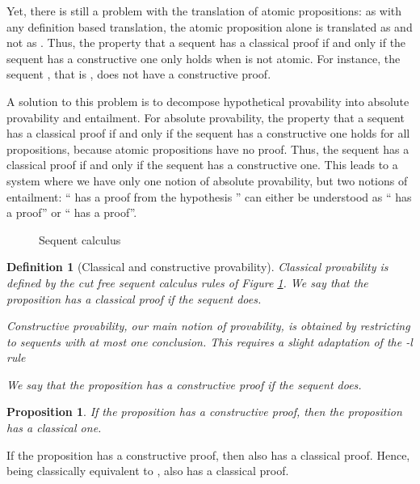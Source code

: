 \documentclass{article}
\newtheorem{definition}{Definition}
\newtheorem{proposition}{Proposition}
\begin{document}
Yet, there is still a problem with the translation of atomic
propositions: as with any definition based translation, the atomic
proposition  alone is translated as  and not as .
Thus, the property that a sequent  has a classical
proof if and only if the sequent  has a
constructive one only holds when  is not atomic. For instance, the
sequent , that is , does not have a constructive proof.

A solution to this problem is to decompose hypothetical provability into
absolute provability and entailment. For absolute provability, 
the property that a sequent  has a classical proof if and only if 
the sequent  has a constructive one holds for all propositions,
because atomic propositions have no proof.
Thus, the sequent
 has a classical proof if and only if the
sequent  has a constructive one. This leads to a system where 
we have only one notion of absolute provability, but two notions of entailment:
`` has a proof from the hypothesis '' can either be understood
as `` has a proof'' or `` has a
proof''.

\begin{figure}
\noindent\framebox{\parbox{\textwidth
}{
{

}}}
\caption{Sequent calculus}
\label{classical}
\end{figure}

\begin{definition}[Classical and constructive provability]
Classical provability is defined by the cut free sequent calculus rules of
Figure \ref{classical}. 
We say that the proposition  has a classical 
proof if the sequent  does.

Constructive provability, our main 
notion of provability, is obtained by 
restricting to sequents with at most one conclusion. This requires a slight 
adaptation of the -l rule

We say that the proposition  has a constructive 
proof if the sequent  does.
\end{definition}

\begin{proposition}\label{direct}
If the proposition  has a constructive proof,
then the proposition  has a classical one.  
\end{proposition}

If the proposition 
 has a constructive proof, then 
also has a classical proof. Hence,  being classically
equivalent to ,  also has a classical proof.

\smallskip
\end{document}
